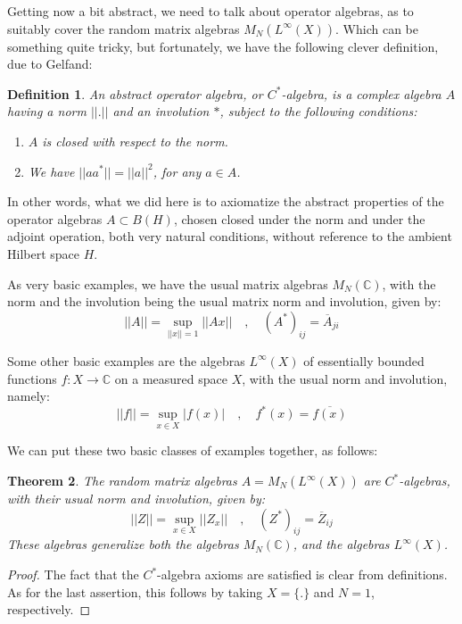 \documentclass[12pt]{amsbook}
\newtheorem{theorem}{Theorem}[chapter]
\newtheorem{definition}[theorem]{Definition}
\begin{document}
Getting now a bit abstract, we need to talk about operator algebras, as to suitably cover the random matrix algebras $M_N(L^\infty(X))$. Which can be something quite tricky, but fortunately, we have the following clever definition, due to Gelfand:

\begin{definition}
An abstract operator algebra, or $C^*$-algebra, is a complex algebra $A$ having a norm $||.||$ and an involution $*$, subject to the following conditions:
\begin{enumerate}
\item $A$ is closed with respect to the norm.

\item We have $||aa^*||=||a||^2$, for any $a\in A$.
\end{enumerate}
\end{definition}

In other words, what we did here is to axiomatize the abstract properties of the operator algebras $A\subset B(H)$, chosen closed under the norm and under the adjoint operation, both very natural conditions, without reference to the ambient Hilbert space $H$.

\bigskip

As very basic examples, we have the usual matrix algebras $M_N(\mathbb C)$, with the norm and the involution being the usual matrix norm and involution, given by:
$$||A||=\sup_{||x||=1}||Ax||\quad,\quad 
(A^*)_{ij}=\overline{A}_{ji}$$

Some other basic examples are the algebras $L^\infty(X)$ of essentially bounded functions $f:X\to\mathbb C$ on a measured space $X$, with the usual norm and involution, namely:
$$||f||=\sup_{x\in X}|f(x)|\quad,\quad 
f^*(x)=\overline{f(x)}$$

We can put these two basic classes of examples together, as follows:


\begin{theorem}
The random matrix algebras $A=M_N(L^\infty(X))$ are $C^*$-algebras, with their usual norm and involution, given by:
$$||Z||=\sup_{x\in X}||Z_x||\quad,\quad 
(Z^*)_{ij}=\overline{Z}_{ij}$$
These algebras generalize both the algebras $M_N(\mathbb C)$, and the algebras $L^\infty(X)$.
\end{theorem}

\begin{proof}
The fact that the $C^*$-algebra axioms are satisfied is clear from definitions. As for the last assertion, this follows by taking $X=\{.\}$ and $N=1$, respectively.
\end{proof}
\end{document}
